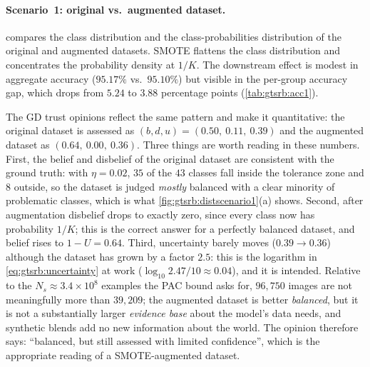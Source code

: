 \paragraph{Scenario~1: original vs.\ augmented dataset.}
 compares the class distribution and the class-probabilities distribution of the original and augmented datasets. SMOTE flattens the class distribution and concentrates the probability density at $1/K$. The downstream effect is modest in aggregate accuracy ($95.17\%$ vs.\ $95.10\%$) but visible in the per-group accuracy gap, which drops from $5.24$ to $3.88$ percentage points (\cref{tab:gtsrb:acc1}).

The GD trust opinions reflect the same pattern and make it quantitative: the original dataset is assessed as $(b, d, u) = (0.50,\ 0.11,\ 0.39)$ and the augmented dataset as $(0.64,\ 0.00,\ 0.36)$. Three things are worth reading in these numbers. First, the belief and disbelief of the original dataset are consistent with the ground truth: with $\eta = 0.02$, $35$ of the $43$ classes fall inside the tolerance zone and $8$ outside, so the dataset is judged \emph{mostly} balanced with a clear minority of problematic classes, which is what \cref{fig:gtsrb:distscenario1}(a) shows. Second, after augmentation disbelief drops to exactly zero, since every class now has probability $1/K$; this is the correct answer for a perfectly balanced dataset, and belief rises to $1 - U = 0.64$. Third, uncertainty barely moves ($0.39 \to 0.36$) although the dataset has grown by a factor $2.5$: this is the logarithm in \cref{eq:gtsrb:uncertainty} at work ($\log_{10} 2.47 / 10 \approx 0.04$), and it is intended. Relative to the $N_s \approx 3.4 \times 10^{8}$ examples the \ac{PAC} bound asks for, $96{,}750$ images are not meaningfully more than $39{,}209$; the augmented dataset is better \emph{balanced}, but it is not a substantially larger \emph{evidence base} about the model's data needs, and synthetic blends add no new information about the world. The opinion therefore says: ``balanced, but still assessed with limited confidence'', which is the appropriate reading of a SMOTE-augmented dataset.

